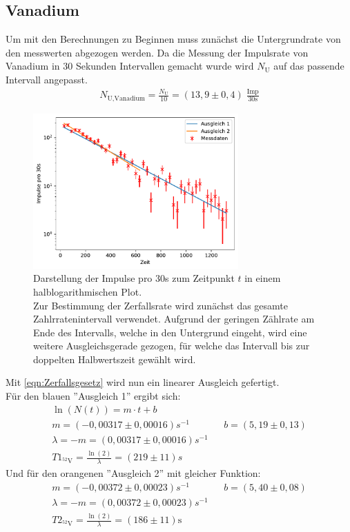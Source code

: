 \subsection{Vanadium}
Um mit den Berechnungen zu Beginnen muss zunächst die Untergrundrate von den messwerten abgezogen werden.
Da die Messung der Impulsrate von Vanadium in 30 Sekunden Intervallen gemacht wurde wird $N_{\text{U}}$ auf das passende Intervall angepasst.
\begin{align*}
    N_{\text{U},\text{Vanadium}} =  \frac{N_{\text{U}}}{10} = (13,9 \pm 0,4) \; \frac{\text{Imp}}{30\text{s}}
\end{align*}
\begin{figure}
    \centering
    \includegraphics[width=0.7\textwidth]{plots/Vanadium.pdf}
    \caption{Darstellung der Impulse pro 30s zum Zeitpunkt $t$ in einem halblogarithmischen Plot.\\
    Zur Bestimmung der Zerfallsrate wird zunächst das gesamte Zahlrratenintervall verwendet. 
    Aufgrund der geringen Zählrate am Ende des Intervalls, welche in den Untergrund eingeht, wird eine
    weitere Ausgleichsgerade gezogen, für welche das Intervall bis zur doppelten Halbwertszeit gewählt wird. }
\end{figure}
Mit \ref{eqn:Zerfallsgesetz} wird nun ein linearer Ausgleich gefertigt. \\
Für den blauen ''Ausgleich 1'' ergibt sich:
\begin{align*}
    \ln(N(t)) = m \cdot t + b\\
     m = (-0,00317 \pm 0,00016)\si{s^{-1}} && b = (5,19 \pm 0,13) \\
    \lambda = -m = (0,00317 \pm 0,00016)\si{s^{-1}} \\
    T1_{^{52}\text{V}} = \frac{\ln(2)}{\lambda} = (219 \pm 11) \si{s}
\end{align*}
Und für den orangenen ''Ausgleich 2'' mit gleicher Funktion:
\begin{align*}
     m = (-0,00372 \pm 0,00023)\si{s^{-1}} && b = (5,40 \pm 0,08) \\
    \lambda = -m = (0,00372 \pm 0,00023)\si{s^{-1}} \\
    T2_{^{52}\text{V}} = \frac{\ln(2)}{\lambda} = (186 \pm 11) \text{s}
\end{align*}

